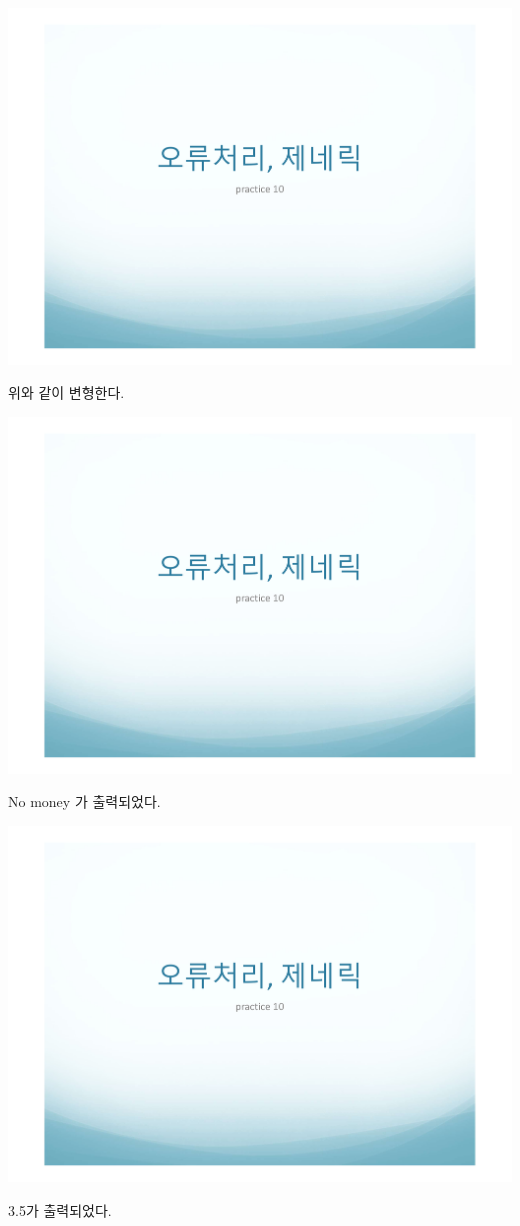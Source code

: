 \documentclass[12pt,a4paper]{article}
\begin{document}
\includegraphics[page=9, width=\textwidth]{1.pdf}

위와 같이 변형한다.

\includegraphics[page=10, width=\textwidth]{1.pdf}

No money 가 출력되었다.

\includegraphics[page=11, width=\textwidth]{1.pdf}

3.5가 출력되었다.
\end{document}
